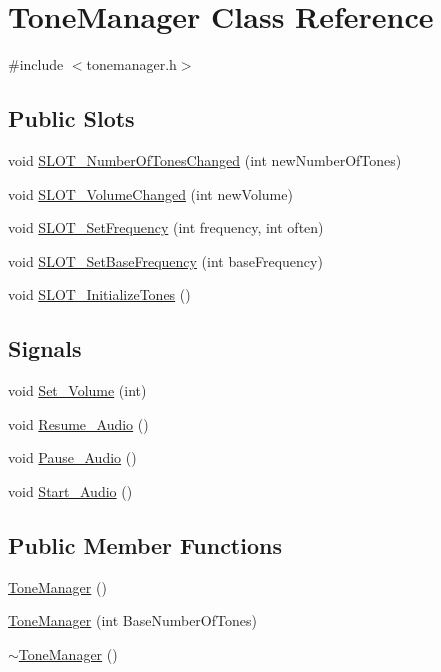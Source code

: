 \hypertarget{class_tone_manager}{\section{Tone\-Manager Class Reference}
\label{class_tone_manager}
}


{\ttfamily \#include $<$tonemanager.\-h$>$}

\subsection*{Public Slots}
\begin{DoxyCompactItemize}
\item 
void \hyperlink{class_tone_manager_a4491c3853b267e69d839e5d07db6c65f}{S\-L\-O\-T\-\_\-\-Number\-Of\-Tones\-Changed} (int new\-Number\-Of\-Tones)
\item 
void \hyperlink{class_tone_manager_af3235b97bd5eb323707df906c2057194}{S\-L\-O\-T\-\_\-\-Volume\-Changed} (int new\-Volume)
\item 
void \hyperlink{class_tone_manager_a012e94dca7cfd276a5d84d79c9d8564d}{S\-L\-O\-T\-\_\-\-Set\-Frequency} (int frequency, int often)
\item 
void \hyperlink{class_tone_manager_a9b7baa7bd7d8b3a25dc37c700439dfff}{S\-L\-O\-T\-\_\-\-Set\-Base\-Frequency} (int base\-Frequency)
\item 
void \hyperlink{class_tone_manager_a2de4f382875c53549d203e37c03a1b5c}{S\-L\-O\-T\-\_\-\-Initialize\-Tones} ()
\end{DoxyCompactItemize}
\subsection*{Signals}
\begin{DoxyCompactItemize}
\item 
void \hyperlink{class_tone_manager_a350057c72bfef92eafd78fcf663a4780}{Set\-\_\-\-Volume} (int)
\item 
void \hyperlink{class_tone_manager_adef20253e76dd81cb8b730a04a4c611d}{Resume\-\_\-\-Audio} ()
\item 
void \hyperlink{class_tone_manager_a1585c35147c628bffcca0683d87e9275}{Pause\-\_\-\-Audio} ()
\item 
void \hyperlink{class_tone_manager_a9c6253effbaab4dca2b087bc4ab88598}{Start\-\_\-\-Audio} ()
\end{DoxyCompactItemize}
\subsection*{Public Member Functions}
\begin{DoxyCompactItemize}
\item 
\hyperlink{class_tone_manager_a8638f3e1194ff8745c867e32b4da6c9b}{Tone\-Manager} ()
\item 
\hyperlink{class_tone_manager_adce76ae3f2ae844fbed2c56a3100a3c9}{Tone\-Manager} (int Base\-Number\-Of\-Tones)
\item 
\hyperlink{class_tone_manager_ae244662cb3d420d41e3f0a178b5cdfdf}{$\sim$\-Tone\-Manager} ()
\end{DoxyCompactItemize}
